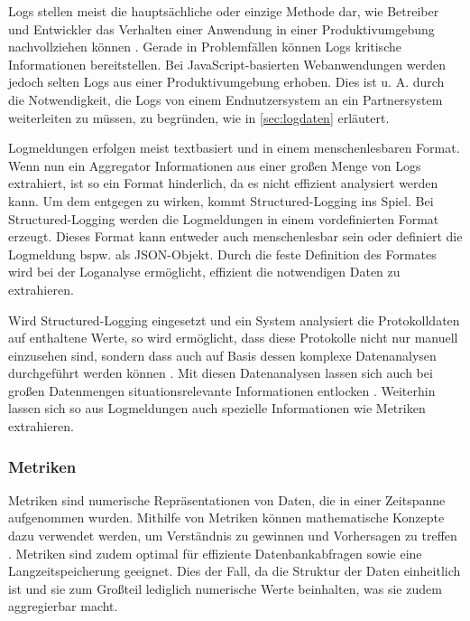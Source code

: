 Logs stellen meist die hauptsächliche oder einzige Methode dar, wie Betreiber und Entwickler das Verhalten einer Anwendung in einer Produktivumgebung nachvollziehen können  \cite{EventLogsForTheAnalysisOfSoftwareFailures} \cite{LearningToLog}. Gerade in Problemfällen können Logs kritische Informationen bereitstellen. Bei JavaScript-basierten Webanwendungen werden jedoch selten Logs aus einer Produktivumgebung erhoben. Dies ist u. A. durch die Notwendigkeit, die Logs von einem Endnutzersystem an ein Partnersystem weiterleiten zu müssen, zu begründen, wie in \autoref{sec:logdaten} erläutert.

Logmeldungen erfolgen meist textbasiert und in einem menschenlesbaren Format. Wenn nun ein Aggregator Informationen aus einer großen Menge von Logs extrahiert, ist so ein Format hinderlich, da es nicht effizient analysiert werden kann. Um dem entgegen zu wirken, kommt Structured-Logging ins Spiel. Bei Structured-Logging \cite{StructuredAndInteroperableLogging} werden die Logmeldungen in einem vordefinierten Format erzeugt. Dieses Format kann entweder auch menschenlesbar sein oder definiert die Logmeldung bspw. als JSON-Objekt. Durch die feste Definition des Formates wird bei der Loganalyse ermöglicht, effizient die notwendigen Daten zu extrahieren.

Wird Structured-Logging eingesetzt und ein System analysiert die Protokolldaten auf enthaltene Werte, so wird ermöglicht, dass diese Protokolle nicht nur manuell einzusehen sind, sondern dass auch auf Basis dessen komplexe Datenanalysen durchgeführt werden können \cite{StructuredAndInteroperableLogging}. Mit diesen Datenanalysen lassen sich auch bei großen Datenmengen situationsrelevante Informationen entlocken \cite{StructuredLoggingCraftingUsefulMessageContent}. Weiterhin lassen sich so aus Logmeldungen auch spezielle Informationen wie Metriken extrahieren.

\subsubsection{Metriken}

Metriken sind numerische Repräsentationen von Daten, die in einer Zeitspanne aufgenommen wurden. Mithilfe von Metriken können mathematische Konzepte dazu verwendet werden, um Verständnis zu gewinnen und Vorhersagen zu treffen \cite{DistributedSystemsObservability}. Metriken sind zudem optimal für effiziente Datenbankabfragen sowie eine Langzeitspeicherung geeignet. Dies der Fall, da die Struktur der Daten einheitlich ist und sie zum Großteil lediglich numerische Werte beinhalten, was sie zudem aggregierbar macht.

